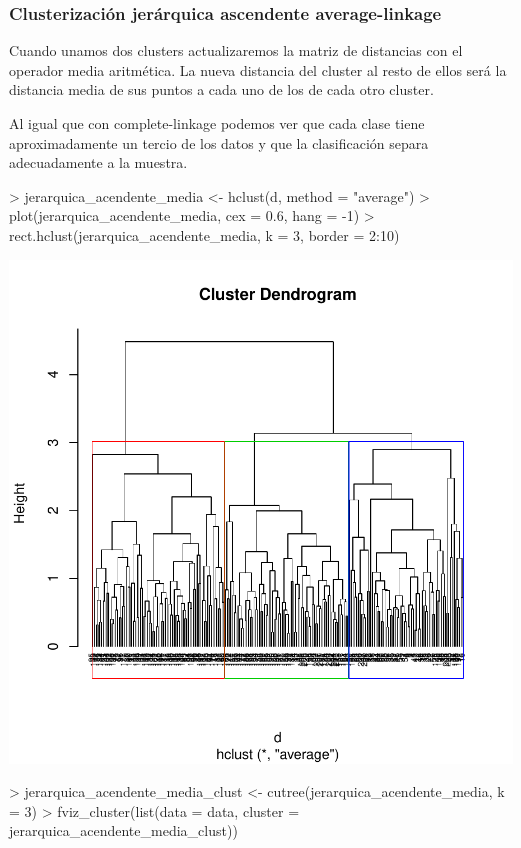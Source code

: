 \documentclass [a4paper] {article}
\begin{document}
\subsubsection{Clusterización jerárquica ascendente average-linkage}
Cuando unamos dos clusters actualizaremos la matriz de distancias con el operador media aritmética.
La nueva distancia del cluster al resto de ellos será la distancia media de sus puntos a cada uno de los de cada otro cluster.
\begin{center}
Al igual que con complete-linkage podemos ver que cada clase tiene aproximadamente un tercio de los datos y que la clasificación separa adecuadamente a la muestra.
\begin{Schunk}
\begin{Sinput}
> jerarquica_acendente_media <- hclust(d, method = "average")
> plot(jerarquica_acendente_media, cex = 0.6, hang = -1)
> rect.hclust(jerarquica_acendente_media, k = 3, border = 2:10)
\end{Sinput}
\end{Schunk}
\includegraphics{entrega-jerarquica_acendente_media}
\begin{Schunk}
\begin{Sinput}
> jerarquica_acendente_media_clust <- cutree(jerarquica_acendente_media, k = 3)
> fviz_cluster(list(data = data, cluster = jerarquica_acendente_media_clust))

\end{Sinput}
\end{Schunk}
\end{center}
\end{document}
